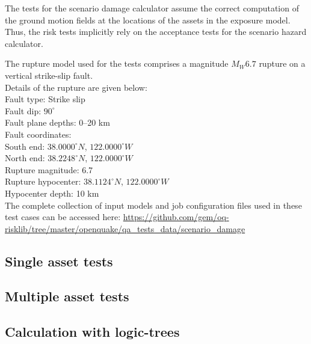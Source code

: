 The tests for the scenario damage calculator assume the correct computation of the ground motion fields at the locations of the assets in the exposure model. Thus, the risk tests implicitly rely on the acceptance tests for the scenario hazard calculator.

The rupture model used for the tests comprises a magnitude $M_W 6.7$ rupture on a vertical strike-slip fault.\\

\noindent Details of the rupture are given below:\\

\noindent
Fault type: Strike slip\\
Fault dip: $90^{\circ}$\\
Fault plane depths: 0--20 km\\
Fault coordinates:\\
South end: $38.0000^{\circ} N$, $122.0000^{\circ} W$\\
North end: $38.2248^{\circ} N$, $122.0000^{\circ} W$\\
Rupture magnitude: 6.7\\
Rupture hypocenter: $38.1124^{\circ} N$, $122.0000^{\circ} W$\\
Hypocenter depth: 10 km\\

The complete collection of input models and job configuration files used in these test cases can be accessed here:
\href{https://github.com/gem/oq-risklib/tree/master/openquake/qa_tests_data/scenario_damage}
{https://github.com/gem/oq-risklib/tree/master/openquake/qa\_tests\_data/scenario\_damage}

\subsection{Single asset tests}
\label{subsec:acc-scenario-damage-single}


\subsection{Multiple asset tests}
\label{subsec:acc-scenario-damage-multiple}


\subsection{Calculation with logic-trees}
\label{subsec:acc-scenario-damage-logictrees}


